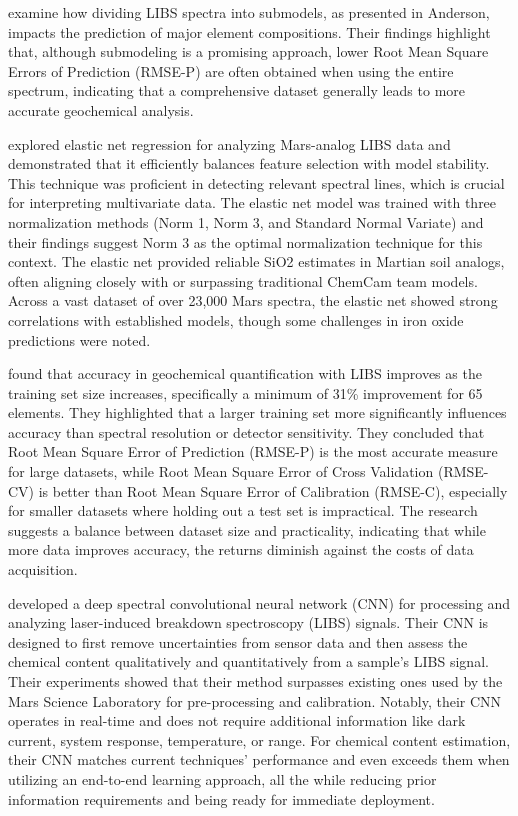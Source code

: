 \citeauthor{lepore_quantitative_2022} \cite{lepore_quantitative_2022} examine how dividing LIBS spectra into submodels, as presented in Anderson, impacts the prediction of major element compositions.
Their findings highlight that, although submodeling is a promising approach, lower Root Mean Square Errors of Prediction (RMSE-P) are often obtained when using the entire spectrum, indicating that a comprehensive dataset generally leads to more accurate geochemical analysis.

\citeauthor{bai_application_2023} \cite{bai_application_2023} explored elastic net regression for analyzing Mars-analog LIBS data and demonstrated that it efficiently balances feature selection with model stability.
This technique was proficient in detecting relevant spectral lines, which is crucial for interpreting multivariate data.
The elastic net model was trained with three normalization methods (Norm 1, Norm 3, and Standard Normal Variate) and their findings suggest Norm 3 as the optimal normalization technique for this context.
The elastic net provided reliable SiO2 estimates in Martian soil analogs, often aligning closely with or surpassing traditional ChemCam team models.
Across a vast dataset of over 23,000 Mars spectra, the elastic net showed strong correlations with established models, though some challenges in iron oxide predictions were noted.\cite{bai_application_2023}

\citeauthor{dyar_effect_2021} \cite{dyar_effect_2021} found that accuracy in geochemical quantification with LIBS improves as the training set size increases, specifically a minimum of 31\% improvement for 65 elements.
They highlighted that a larger training set more significantly influences accuracy than spectral resolution or detector sensitivity.
They concluded that Root Mean Square Error of Prediction (RMSE-P) is the most accurate measure for large datasets, while Root Mean Square Error of Cross Validation  (RMSE-CV) is better than Root Mean Square Error of Calibration (RMSE-C), especially for smaller datasets where holding out a test set is impractical.
The research suggests a balance between dataset size and practicality, indicating that while more data improves accuracy, the returns diminish against the costs of data acquisition.

\citeauthor{castorena_deep_2021} \cite{castorena_deep_2021} developed a deep spectral convolutional neural network (CNN) for processing and analyzing laser-induced breakdown spectroscopy (LIBS) signals.
Their CNN is designed to first remove uncertainties from sensor data and then assess the chemical content qualitatively and quantitatively from a sample's LIBS signal.
Their experiments showed that their method surpasses existing ones used by the Mars Science Laboratory for pre-processing and calibration.
Notably, their CNN operates in real-time and does not require additional information like dark current, system response, temperature, or range.
For chemical content estimation, their CNN matches current techniques' performance and even exceeds them when utilizing an end-to-end learning approach, all the while reducing prior information requirements and being ready for immediate deployment.

